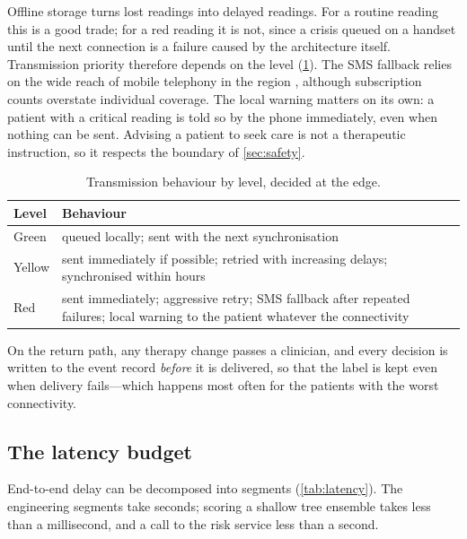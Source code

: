 Offline storage turns lost readings into delayed readings. For a routine reading this is a good trade; for a red reading it is not, since a crisis queued on a handset until the next connection is a failure caused by the architecture itself. Transmission priority therefore depends on the level (\cref{tab:transmission-priority}). The SMS fallback relies on the wide reach of mobile telephony in the region \parencite{dodoo2022}, although subscription counts overstate individual coverage. The local warning matters on its own: a patient with a critical reading is told so by the phone immediately, even when nothing can be sent. Advising a patient to seek care is not a therapeutic instruction, so it respects the boundary of \cref{sec:safety}.

\begin{table}[htbp]
\centering\small
\caption{Transmission behaviour by level, decided at the edge.}\label{tab:transmission-priority}
\begin{tabularx}{\textwidth}{@{}>{\raggedright\arraybackslash}p{2.0cm} X@{}}
\toprule
\textbf{Level} & \textbf{Behaviour} \\
\midrule
Green & queued locally; sent with the next synchronisation \\
Yellow & sent immediately if possible; retried with increasing delays; synchronised within hours \\
Red & sent immediately; aggressive retry; SMS fallback after repeated failures; local warning to the patient whatever the connectivity \\
\bottomrule
\end{tabularx}
\end{table}

On the return path, any therapy change passes a clinician, and every decision is written to the event record \emph{before} it is delivered, so that the label is kept even when delivery fails---which happens most often for the patients with the worst connectivity.

\subsection{The latency budget}\label{sec:latency}

End-to-end delay can be decomposed into segments (\cref{tab:latency}). The engineering segments take seconds; scoring a shallow tree ensemble takes less than a millisecond, and a call to the risk service less than a second.

